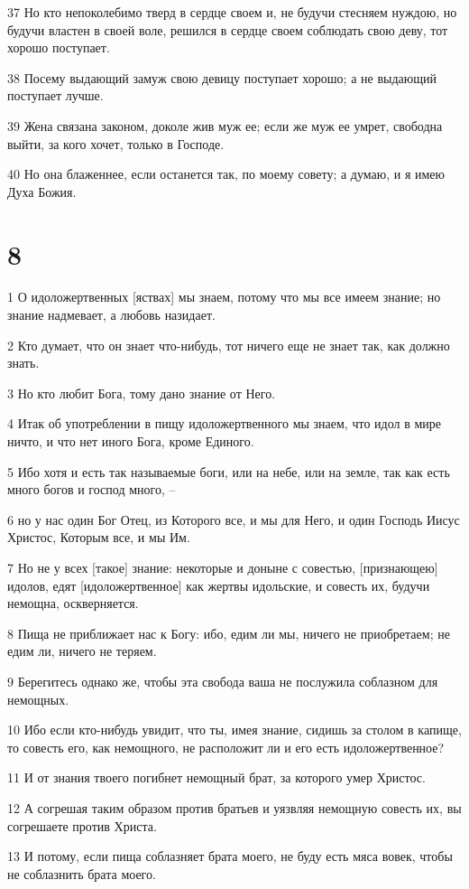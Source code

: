 \par 37 Но кто непоколебимо тверд в сердце своем и, не будучи стесняем нуждою, но будучи властен в своей воле, решился в сердце своем соблюдать свою деву, тот хорошо поступает.
\par 38 Посему выдающий замуж свою девицу поступает хорошо; а не выдающий поступает лучше.
\par 39 Жена связана законом, доколе жив муж ее; если же муж ее умрет, свободна выйти, за кого хочет, только в Господе.
\par 40 Но она блаженнее, если останется так, по моему совету; а думаю, и я имею Духа Божия.

\chapter{8}

\par 1 О идоложертвенных [яствах] мы знаем, потому что мы все имеем знание; но знание надмевает, а любовь назидает.
\par 2 Кто думает, что он знает что-нибудь, тот ничего еще не знает так, как должно знать.
\par 3 Но кто любит Бога, тому дано знание от Него.
\par 4 Итак об употреблении в пищу идоложертвенного мы знаем, что идол в мире ничто, и что нет иного Бога, кроме Единого.
\par 5 Ибо хотя и есть так называемые боги, или на небе, или на земле, так как есть много богов и господ много, --
\par 6 но у нас один Бог Отец, из Которого все, и мы для Него, и один Господь Иисус Христос, Которым все, и мы Им.
\par 7 Но не у всех [такое] знание: некоторые и доныне с совестью, [признающею] идолов, едят [идоложертвенное] как жертвы идольские, и совесть их, будучи немощна, оскверняется.
\par 8 Пища не приближает нас к Богу: ибо, едим ли мы, ничего не приобретаем; не едим ли, ничего не теряем.
\par 9 Берегитесь однако же, чтобы эта свобода ваша не послужила соблазном для немощных.
\par 10 Ибо если кто-нибудь увидит, что ты, имея знание, сидишь за столом в капище, то совесть его, как немощного, не расположит ли и его есть идоложертвенное?
\par 11 И от знания твоего погибнет немощный брат, за которого умер Христос.
\par 12 А согрешая таким образом против братьев и уязвляя немощную совесть их, вы согрешаете против Христа.
\par 13 И потому, если пища соблазняет брата моего, не буду есть мяса вовек, чтобы не соблазнить брата моего.

